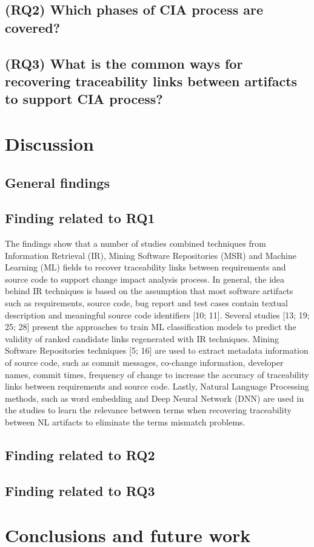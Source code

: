 \documentclass[conference]{IEEEtran}
\begin{document}
\subsection{(RQ2) Which phases of CIA process are covered? }
\subsection{(RQ3) What is the common ways for recovering traceability links between artifacts to support CIA process?}
\section{Discussion}
\subsection{General findings}
\subsection{Finding related to RQ1}
The findings show that a number of studies combined techniques from Information Retrieval (IR), Mining Software Repositories (MSR) and Machine Learning (ML) fields to recover traceability links between requirements and source code to support change impact analysis process. In general, the idea behind IR techniques is based on the assumption that most software artifacts such as requirements, source code, bug report and test cases contain textual description and meaningful source code identifiers [10; 11].  Several studies [13; 19; 25; 28] present the approaches to train ML classification models to predict the validity of ranked candidate links regenerated with IR techniques.  Mining Software Repositories techniques [5; 16] are used to extract metadata information of source code, such as commit messages, co-change information, developer names, commit times, frequency of change to increase the accuracy of traceability links between requirements and source code. Lastly, Natural Language Processing methods, such as word embedding and Deep Neural Network (DNN) are used in the studies to learn the relevance between terms when recovering traceability between NL artifacts to eliminate the terms mismatch problems. 
\subsection{Finding related to RQ2}
\subsection{Finding related to RQ3}
\section{Conclusions and future work}
\end{document}
